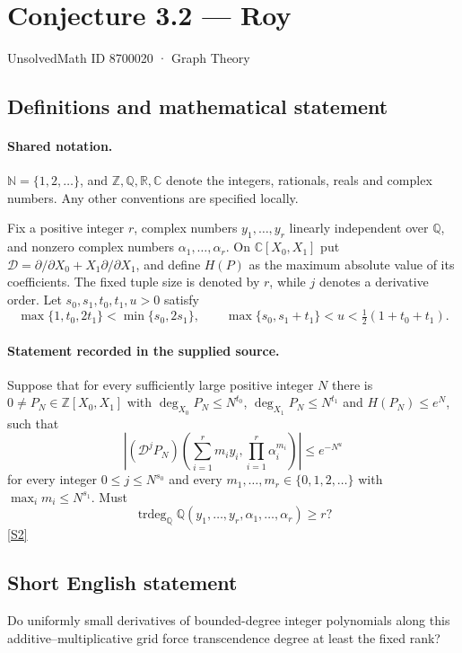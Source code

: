 \documentclass[11pt]{article}
\newcommand{\sref}[2]{\hyperlink{source:#1:#2}{[S#2]}}
\begin{document}
\setcounter{section}{8700019}
\section{Conjecture 3.2 — Roy}\label{8700020}
{\small\sffamily UnsolvedMath ID 8700020 · Graph Theory}
\subsection{Definitions and mathematical statement}

\paragraph{Shared notation.}$\mathbb N=\{1,2,\ldots\}$, and $\mathbb Z,\mathbb Q,\mathbb R,\mathbb C$ denote the integers, rationals, reals and complex numbers. Any other conventions are specified locally.


Fix a positive integer $r$, complex numbers $y_1,\ldots,y_r$ linearly independent over $\mathbb Q$, and nonzero complex numbers $\alpha_1,\ldots,\alpha_r$. On $\mathbb C[X_0,X_1]$ put $\mathcal D=\partial/\partial X_0+X_1\partial/\partial X_1$, and define $H(P)$ as the maximum absolute value of its coefficients. The fixed tuple size is denoted by $r$, while $j$ denotes a derivative order. Let $s_0,s_1,t_0,t_1,u>0$ satisfy \[\max\{1,t_0,2t_1\}<\min\{s_0,2s_1\},\qquad \max\{s_0,s_1+t_1\}<u<\tfrac12(1+t_0+t_1).\]
\paragraph{Statement recorded in the supplied source.}
Suppose that for every sufficiently large positive integer $N$ there is $0\ne P_N\in\mathbb Z[X_0,X_1]$ with $\deg_{X_0}P_N\le N^{t_0}$, $\deg_{X_1}P_N\le N^{t_1}$ and $H(P_N)\le e^N$, such that \[\left|(\mathcal D^jP_N)\left(\sum_{i=1}^r m_i y_i,\prod_{i=1}^r\alpha_i^{m_i}\right)\right|\le e^{-N^u}\] for every integer $0\le j\le N^{s_0}$ and every $m_1,\ldots,m_r\in\{0,1,2,\ldots\}$ with $\max_i m_i\le N^{s_1}$. Must \[\operatorname{trdeg}_{\mathbb Q}\mathbb Q(y_1,\ldots,y_r,\alpha_1,\ldots,\alpha_r)\ge r?\] \sref{8700020}{2}
\subsection{Short English statement}
Do uniformly small derivatives of bounded-degree integer polynomials along this additive–multiplicative grid force transcendence degree at least the fixed rank?
\end{document}
